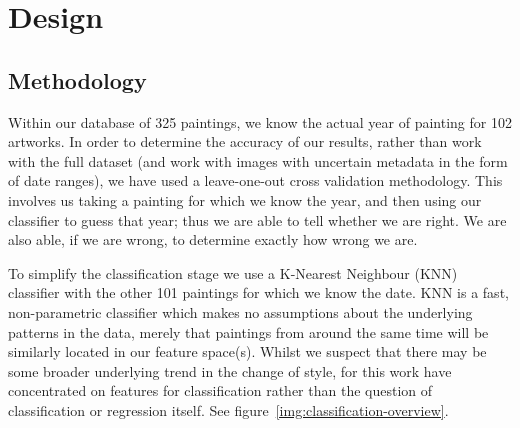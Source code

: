\chapter{Design}







\section{Methodology}

Within our database of 325 paintings, we know the actual year of painting for
102 artworks. In order to determine the accuracy of our results, rather than
work with the full dataset (and work with images with uncertain metadata in the
form of date ranges), we have used a leave-one-out cross validation
methodology. This involves us taking a painting for which we know the year, and
then using our classifier to guess that year; thus we are able to tell whether
we are right. We are also able, if we are wrong, to determine exactly how wrong
we are.  

To simplify the classification stage we use a K-Nearest Neighbour (KNN)
classifier with the other 101 paintings for which we know the date. KNN is a
fast, non-parametric classifier which makes no assumptions about the underlying
patterns in the data, merely that paintings from around the same time will be
similarly located in our feature space(s). Whilst we suspect that there may be
some broader underlying trend in the change of style, for this work have
concentrated on features for classification rather than the question of
classification or regression itself. See figure~\ref{img:classification-overview}.

